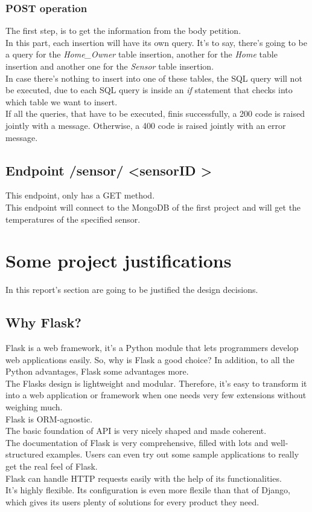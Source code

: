 \documentclass[a4paper,12pt]{article}
\begin{document}
\subsubsection*{POST operation}
The first step, is to get the information from the body petition.\\
In this part, each insertion will have its own query. It's to say, there's going to be a query for the \textit{Home\_Owner} table insertion, another for the \textit{Home} table insertion and another one for the \textit{Sensor} table insertion.\\
In case there's nothing to insert into one of these tables, the SQL query will not be executed, due to each SQL query is inside an \textit{if} statement that checks into which table we want to insert.\\
If all the queries, that have to be executed, finis successfully, a 200 code is raised jointly with a message. Otherwise, a 400 code is raised jointly with an error message.
\subsection*{Endpoint /sensor/ \textless sensorID \textgreater}
This endpoint, only has a GET method.\\
This endpoint will connect to the MongoDB of the first project and will get the temperatures of the specified sensor.
\newpage
\section*{Some project justifications}
In this report's section are going to be justified the design decisions.
\subsection*{Why Flask?}
Flask is a web framework, it’s a Python module that lets programmers develop web applications easily.
So, why is Flask a good choice? In addition, to all the Python advantages, Flask some advantages more.\\
The Flasks design is lightweight and modular. Therefore, it's easy to transform it into a web application or framework when one needs very few extensions without weighing much.\\
Flask is ORM-agnostic.\\
The basic foundation of API is very nicely shaped and made coherent.\\
The documentation of Flask is very comprehensive, filled with lots and well-structured examples. Users can even try out some sample applications to really get the real feel of Flask.\\
Flask can handle HTTP requests easily with the help of its functionalities.\\
It's highly flexible. Its configuration is even more flexile than that of Django, which gives its users plenty of solutions for every product they need.
\end{document}
